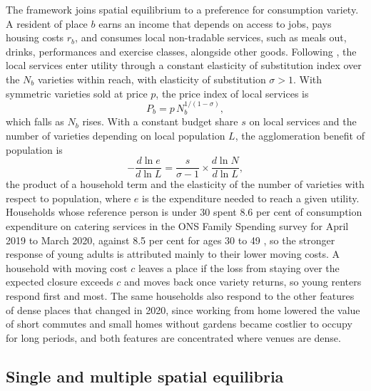 \documentclass[11pt,a4paper]{article}
\begin{document}
The framework joins spatial equilibrium to a preference for consumption variety. A resident of place $b$ earns an income that depends on access to jobs, pays housing costs $r_b$, and consumes local non-tradable services, such as meals out, drinks, performances and exercise classes, alongside other goods. Following \citet{dixit1977}, the local services enter utility through a constant elasticity of substitution index over the $N_b$ varieties within reach, with elasticity of substitution $\sigma > 1$. With symmetric varieties sold at price $p$, the price index of local services is
\begin{equation}
P_b = p \, N_b^{1/(1-\sigma)},
\end{equation}
which falls as $N_b$ rises. With a constant budget share $s$ on local services and the number of varieties depending on local population $L$, the agglomeration benefit of population is
\begin{equation}\label{eq:share}
-\frac{d \ln e}{d \ln L} = \frac{s}{\sigma - 1} \times \frac{d \ln N}{d \ln L},
\end{equation}
the product of a household term and the elasticity of the number of varieties with respect to population, where $e$ is the expenditure needed to reach a given utility. Households whose reference person is under 30 spent 8.6 per cent of consumption expenditure on catering services in the ONS Family Spending survey for April 2019 to March 2020, against 8.5 per cent for ages 30 to 49 \citep{ons2021familyspending}, so the stronger response of young adults is attributed mainly to their lower moving costs. A household with moving cost $c$ leaves a place if the loss from staying over the expected closure exceeds $c$ and moves back once variety returns, so young renters respond first and most. The same households also respond to the other features of dense places that changed in 2020, since working from home lowered the value of short commutes and small homes without gardens became costlier to occupy for long periods, and both features are concentrated where venues are dense.

\subsection{Single and multiple spatial equilibria}\label{sec:equilibria}
\end{document}
